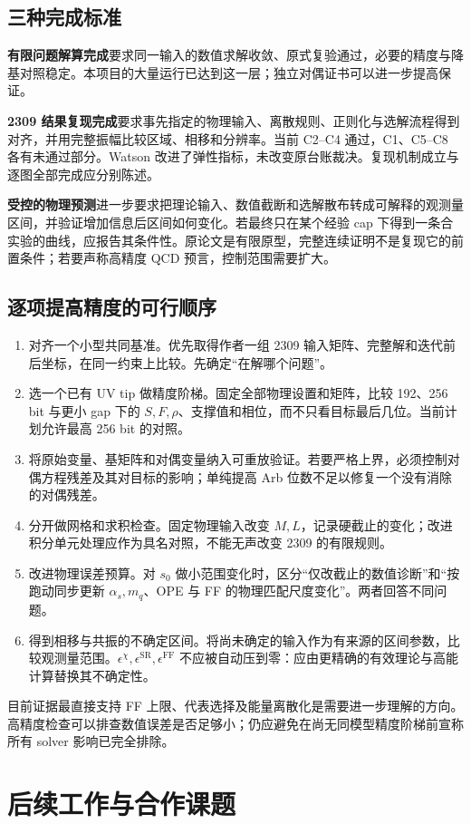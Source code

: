 \documentclass[UTF8,a4paper,11pt,fontset=fandol]{ctexart}
\numberwithin{equation}{section}
\newcommand{\eChi}{\epsilon^{\chi}}
\newcommand{\eSR}{\epsilon^{\mathrm{SR}}}
\newcommand{\eFF}{\epsilon^{\mathrm{FF}}}
\newcommand{\newchapter}[1]{\FloatBarrier\Needspace{9\baselineskip}\section{#1}}
\begin{document}
\subsection{三种完成标准}
\textbf{有限问题解算完成}要求同一输入的数值求解收敛、原式复验通过，必要的精度与降基对照稳定。本项目的大量运行已达到这一层；独立对偶证书可以进一步提高保证。

\textbf{2309 结果复现完成}要求事先指定的物理输入、离散规则、正则化与选解流程得到对齐，并用完整振幅比较区域、相移和分辨率。当前 C2--C4 通过，C1、C5--C8 各有未通过部分。Watson 改进了弹性指标，未改变原台账裁决。复现机制成立与逐图全部完成应分别陈述。

\textbf{受控的物理预测}进一步要求把理论输入、数值截断和选解散布转成可解释的观测量区间，并验证增加信息后区间如何变化。若最终只在某个经验 cap 下得到一条合实验的曲线，应报告其条件性。原论文是有限原型，完整连续证明不是复现它的前置条件；若要声称高精度 QCD 预言，控制范围需要扩大。

\subsection{逐项提高精度的可行顺序}
\begin{enumerate}
\item 对齐一个小型共同基准。优先取得作者一组 2309 输入矩阵、完整解和迭代前后坐标，在同一约束上比较。先确定“在解哪个问题”。
\item 选一个已有 UV tip 做精度阶梯。固定全部物理设置和矩阵，比较 192、256 bit 与更小 gap 下的 \(S,F,\rho\)、支撑值和相位，而不只看目标最后几位。当前计划允许最高 256 bit 的对照。
\item 将原始变量、基矩阵和对偶变量纳入可重放验证。若要严格上界，必须控制对偶方程残差及其对目标的影响；单纯提高 Arb 位数不足以修复一个没有消除的对偶残差。
\item 分开做网格和求积检查。固定物理输入改变 \(M,L\)，记录硬截止的变化；改进积分单元处理应作为具名对照，不能无声改变 2309 的有限规则。
\item 改进物理误差预算。对 \(s_0\) 做小范围变化时，区分“仅改截止的数值诊断”和“按跑动同步更新 \(\alpha_s,m_q\)、OPE 与 FF 的物理匹配尺度变化”。两者回答不同问题。
\item 得到相移与共振的不确定区间。将尚未确定的输入作为有来源的区间参数，比较观测量范围。\(\eChi,\eSR,\eFF\) 不应被自动压到零：应由更精确的有效理论与高能计算替换其不确定性。
\end{enumerate}

目前证据最直接支持 FF 上限、代表选择及能量离散化是需要进一步理解的方向。高精度检查可以排查数值误差是否足够小；仍应避免在尚无同模型精度阶梯前宣称所有 solver 影响已完全排除。
\newchapter{后续工作与合作课题}\label{sec:future}
\end{document}
